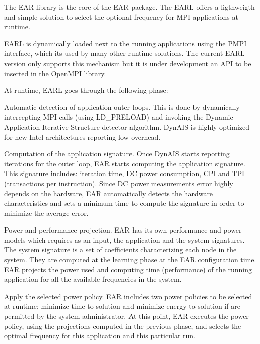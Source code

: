 The E\+AR library is the core of the E\+AR package. The E\+A\+RL offers a ligthweigth and simple solution to select the optional frequency for M\+PI applications at runtime.

E\+A\+RL is dynamically loaded next to the running applications using the P\+M\+PI interface, which it\textquotesingle{}s used by many other runtime solutions. The current E\+A\+RL version only supports this mechanism but it is under development an A\+PI to be inserted in the Open\+M\+PI library.

At runtime, E\+A\+RL goes through the following phase\+:




\begin{DoxyEnumerate}
\item Automatic detection of application outer loops. This is done by dynamically intercepting M\+PI calls (using {\ttfamily L\+D\+\_\+\+P\+R\+E\+L\+O\+AD}) and invoking the Dynamic Application Iterative Structure detector algorithm. Dyn\+A\+IS is highly optimized for new Intel architectures reporting low overhead.
\item Computation of the application signature. Once Dyn\+A\+IS starts reporting iterations for the outer loop, E\+AR starts computing the application signature. This signature includes\+: iteration time, DC power consumption, C\+PI and T\+PI (transactions per instruction). Since DC power measurements error highly depends on the hardware, E\+AR automatically detects the hardware characteristics and sets a minimum time to compute the signature in order to minimize the average error.
\end{DoxyEnumerate}




\begin{DoxyEnumerate}
\item Power and performance projection. E\+AR has its own performance and power models which requires as an input, the application and the system signatures. The system signature is a set of coefficients characterizing each node in the system. They are computed at the learning phase at the E\+AR configuration time. E\+AR projects the power used and computing time (performance) of the running application for all the available frequencies in the system.
\end{DoxyEnumerate}




\begin{DoxyEnumerate}
\item Apply the selected power policy. E\+AR includes two power policies to be selected at runtime\+: \textquotesingle{}minimize time to solution\textquotesingle{} and \textquotesingle{}minimize energy to solution\textquotesingle{} if are permitted by the system administrator. At this point, E\+AR executes the power policy, using the projections computed in the previous phase, and selects the optimal frequency for this application and this particular run.
\end{DoxyEnumerate}

